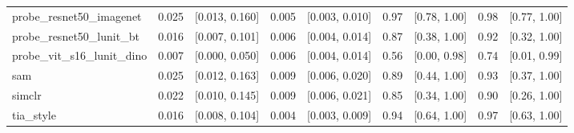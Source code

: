 \begin{tabular}{lrrrrrrrr}
probe\_resnet50\_imagenet & 0.025 & [0.013, 0.160] & 0.005 & [0.003, 0.010] & 0.97 & [0.78, 1.00] & 0.98 & [0.77, 1.00] \\
probe\_resnet50\_lunit\_bt & 0.016 & [0.007, 0.101] & 0.006 & [0.004, 0.014] & 0.87 & [0.38, 1.00] & 0.92 & [0.32, 1.00] \\
probe\_vit\_s16\_lunit\_dino & 0.007 & [0.000, 0.050] & 0.006 & [0.004, 0.014] & 0.56 & [0.00, 0.98] & 0.74 & [0.01, 0.99] \\
sam & 0.025 & [0.012, 0.163] & 0.009 & [0.006, 0.020] & 0.89 & [0.44, 1.00] & 0.93 & [0.37, 1.00] \\
simclr & 0.022 & [0.010, 0.145] & 0.009 & [0.006, 0.021] & 0.85 & [0.34, 1.00] & 0.90 & [0.26, 1.00] \\
tia\_style & 0.016 & [0.008, 0.104] & 0.004 & [0.003, 0.009] & 0.94 & [0.64, 1.00] & 0.97 & [0.63, 1.00] \\
\bottomrule
\end{tabular}
